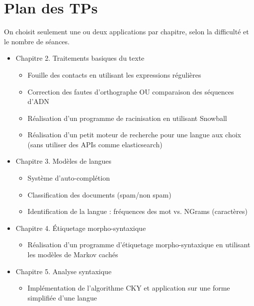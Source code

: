 \documentclass[11pt, a4paper]{article}
\begin{document}
\section{Plan des TPs}

On choisit seulement une ou deux applications par chapitre, selon la difficulté et le nombre de séances.

\begin{itemize}
	
	\item Chapitre 2. Traitements basiques du texte
	\begin{itemize}
		\item Fouille des contacts en utilisant les expressions régulières
		\item Correction des fautes d'orthographe OU comparaison des séquences d'ADN
		\item Réalisation d'un programme de racinisation en utilisant Snowball
		\item Réalisation d'un petit moteur de recherche pour une langue aux choix (sans utiliser des APIs comme elasticsearch)
	\end{itemize}

	\item Chapitre 3. Modèles de langues
	\begin{itemize}
		\item Système d'auto-complétion
		\item Classification des documents (spam/non spam)
		\item Identification de la langue : fréquences des mot vs. NGrams (caractères) %
	\end{itemize}

	\item Chapitre 4. Étiquetage morpho-syntaxique
	\begin{itemize}
		\item Réalisation d'un programme d'étiquetage morpho-syntaxique en utilisant les modèles de Markov cachés
	\end{itemize}

	\item Chapitre 5. Analyse syntaxique
	\begin{itemize}
		\item Implémentation de l'algorithme CKY et application sur une forme simplifiée d'une langue 
	\end{itemize}


\end{itemize}
\end{document}
